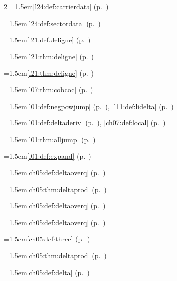 \begin{multicols}{2}
\hangindent=1.5em\quad \ref{l24:def:carrierdata} (p.~\pageref{l24:def:carrierdata})\par
\hangindent=1.5em\quad \ref{l24:def:sectordata} (p.~\pageref{l24:def:sectordata})\par
\hangindent=1.5em\quad \ref{l21:def:deligne} (p.~\pageref{l21:def:deligne})\par
\hangindent=1.5em\quad \ref{l21:thm:deligne} (p.~\pageref{l21:thm:deligne})\par
\hangindent=1.5em\quad \ref{l21:thm:deligne} (p.~\pageref{l21:thm:deligne})\par
\hangindent=1.5em\quad \ref{l07:thm:cobcoc} (p.~\pageref{l07:thm:cobcoc})\par
\hangindent=1.5em\quad \ref{l01:def:negpowjump} (p.~\pageref{l01:def:negpowjump}), \ref{l11:def:lidelta} (p.~\pageref{l11:def:lidelta})\par
\hangindent=1.5em\quad \ref{l01:def:deltaderiv} (p.~\pageref{l01:def:deltaderiv}), \ref{ch07:def:local} (p.~\pageref{ch07:def:local})\par
\hangindent=1.5em\quad \ref{l01:thm:alljump} (p.~\pageref{l01:thm:alljump})\par
\hangindent=1.5em\quad \ref{l01:def:expand} (p.~\pageref{l01:def:expand})\par
\hangindent=1.5em\quad \ref{ch05:def:deltaoverq} (p.~\pageref{ch05:def:deltaoverq})\par
\hangindent=1.5em\quad \ref{ch05:thm:deltaprod} (p.~\pageref{ch05:thm:deltaprod})\par
\hangindent=1.5em\quad \ref{ch05:def:deltaoverq} (p.~\pageref{ch05:def:deltaoverq})\par
\hangindent=1.5em\quad \ref{ch05:def:deltaoverq} (p.~\pageref{ch05:def:deltaoverq})\par
\hangindent=1.5em\quad \ref{ch05:def:three} (p.~\pageref{ch05:def:three})\par
\hangindent=1.5em\quad \ref{ch05:thm:deltaprod} (p.~\pageref{ch05:thm:deltaprod})\par
\hangindent=1.5em\quad \ref{ch05:def:delta} (p.~\pageref{ch05:def:delta})\par

\end{multicols}
